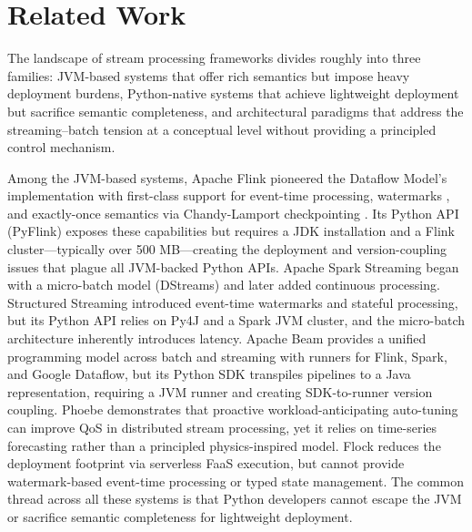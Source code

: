 \documentclass[conference]{IEEEtran}
\begin{document}
\section{Related Work}

The landscape of stream processing frameworks divides roughly into three families: JVM-based systems that offer rich semantics but impose heavy deployment burdens, Python-native systems that achieve lightweight deployment but sacrifice semantic completeness, and architectural paradigms that address the streaming--batch tension at a conceptual level without providing a principled control mechanism.

Among the JVM-based systems, Apache Flink \cite{carbone2015flink} pioneered the Dataflow Model's implementation with first-class support for event-time processing, watermarks \cite{akidau2021watermarks}, and exactly-once semantics via Chandy-Lamport checkpointing \cite{chandy1985distributed}. Its Python API (PyFlink) exposes these capabilities but requires a JDK installation and a Flink cluster---typically over 500 MB---creating the deployment and version-coupling issues that plague all JVM-backed Python APIs. Apache Spark Streaming began with a micro-batch model (DStreams) and later added continuous processing. Structured Streaming introduced event-time watermarks and stateful processing, but its Python API relies on Py4J and a Spark JVM cluster, and the micro-batch architecture inherently introduces latency. Apache Beam \cite{beam2016} provides a unified programming model across batch and streaming with runners for Flink, Spark, and Google Dataflow, but its Python SDK transpiles pipelines to a Java representation, requiring a JVM runner and creating SDK-to-runner version coupling. Phoebe \cite{geldenhuys2022phoebe} demonstrates that proactive workload-anticipating auto-tuning can improve QoS in distributed stream processing, yet it relies on time-series forecasting rather than a principled physics-inspired model. Flock \cite{liao2024flock} reduces the deployment footprint via serverless FaaS execution, but cannot provide watermark-based event-time processing or typed state management. The common thread across all these systems is that Python developers cannot escape the JVM or sacrifice semantic completeness for lightweight deployment.
\end{document}
